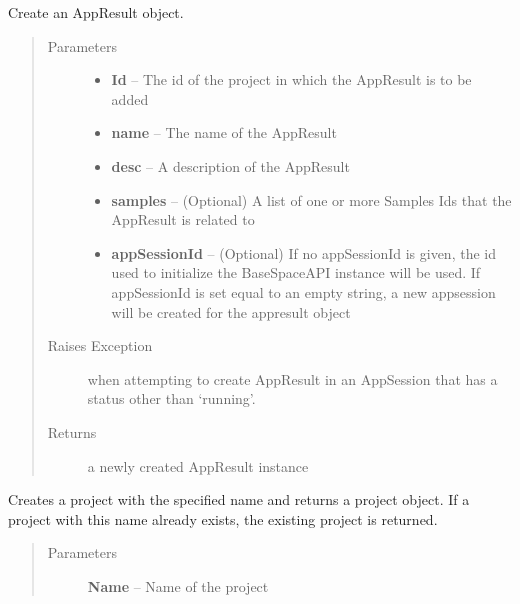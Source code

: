\documentclass[letterpaper,10pt,english]{sphinxmanual}
\begin{document}
\begin{fulllineitems}
\begin{fulllineitems}
\end{fulllineitems}


\begin{fulllineitems}
\label{Available modules:BaseSpacePy.api.BaseSpaceAPI.BaseSpaceAPI.createAppResult}
Create an AppResult object.
\begin{quote}\begin{description}
\item[{Parameters}] \leavevmode\begin{itemize}
\item {} 
\textbf{Id} -- The id of the project in which the AppResult is to be added

\item {} 
\textbf{name} -- The name of the AppResult

\item {} 
\textbf{desc} -- A description of the AppResult

\item {} 
\textbf{samples} -- (Optional) A list of one or more Samples Ids that the AppResult is related to

\item {} 
\textbf{appSessionId} -- (Optional) If no appSessionId is given, the id used to initialize the BaseSpaceAPI instance will be used. If appSessionId is set equal to an empty string, a new appsession will be created for the appresult object

\end{itemize}

\item[{Raises Exception}] \leavevmode
when attempting to create AppResult in an AppSession that has a status other than `running'.

\item[{Returns}] \leavevmode
a newly created AppResult instance

\end{description}\end{quote}

\end{fulllineitems}


\begin{fulllineitems}
\label{Available modules:BaseSpacePy.api.BaseSpaceAPI.BaseSpaceAPI.createProject}
Creates a project with the specified name and returns a project object. 
If a project with this name already exists, the existing project is returned.
\begin{quote}\begin{description}
\item[{Parameters}] \leavevmode
\textbf{Name} -- Name of the project


\end{description}
\end{quote}
\end{fulllineitems}
\end{fulllineitems}
\end{document}
